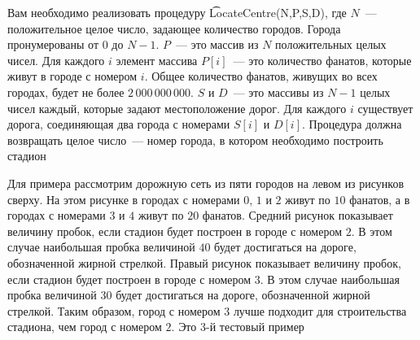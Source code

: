 Вам необходимо реализовать процедуру \t{LocateCentre(N,P,S,D)}, где $N$~--- положительное целое число, задающее количество городов. Города пронумерованы от $0$ до $N-1$. $P$~--- это массив из $N$ положительных целых чисел. Для каждого $i$ элемент массива $P[i]$~--- это количество фанатов, которые живут в городе с номером $i$. Общее количество фанатов, живущих во всех городах, будет не более $2\,000\,000\,000$. $S$ и $D$~--- это массивы из $N-1$ целых чисел каждый, которые задают местоположение дорог. Для каждого $i$ существует дорога, соединяющая два города с номерами $S[i]$ и $D[i]$. Процедура должна возвращать целое число~--- номер города, в котором необходимо построить стадион

Для примера рассмотрим дорожную сеть из пяти городов на левом из рисунков сверху. На этом рисунке в городах с номерами $0$, $1$ и $2$ живут по $10$ фанатов, а в городах с номерами $3$ и $4$ живут по $20$ фанатов. Средний рисунок показывает величину пробок, если стадион будет построен в городе с номером $2$. В этом случае наибольшая пробка величиной $40$ будет достигаться на дороге, обозначенной жирной стрелкой. Правый рисунок показывает величину пробок, если стадион будет построен в городе с номером $3$. В этом случае наибольшая пробка величиной $30$ будет достигаться на дороге, обозначенной жирной стрелкой. Таким образом, город с номером $3$ лучше подходит для строительства стадиона, чем город с номером $2$. Это 3-й тестовый пример